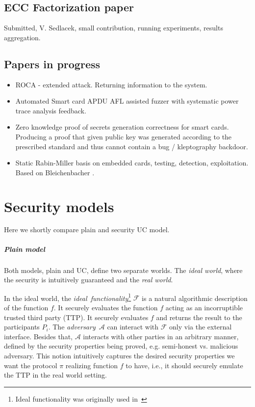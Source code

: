 \documentclass[
  digital, %
  twoside, %
  table,   %
  lof,     %
  lot,     %
]{fithesis3}
\theoremstyle{definition}
\theoremstyle{remark}
\begin{document}
\section{ECC Factorization paper}
Submitted, V. Sedlacek, small contribution, running experiments, results aggregation. 

\section{Papers in progress}
\begin{itemize}
	\item ROCA - extended attack. Returning information to the system.
    
	\item Automated Smart card APDU AFL assisted fuzzer with systematic power trace analysis feedback.
    
    \item Zero knowledge proof of secrets generation correctness for smart cards. Producing a proof that given public key was generated according to the prescribed standard and thus cannot contain a bug / kleptography backdoor. 
    
    \item Static Rabin-Miller basis on embedded cards, testing, detection, exploitation. Based on Bleichenbacher \cite{10.1007/978-3-540-30580-4_2}.
    
\end{itemize}


\chapter{Security models}
\label{apx:uc}
Here we shortly compare plain and security UC model.

\paragraph{Plain model}
Both models, plain and UC, define two separate worlds.
The \emph{ideal world}, where the security is intuitively guaranteed and the \emph{real world}.

In the ideal world, the \emph{ideal~functionality}\footnote{Ideal functionality was originally used in~\cite{GMW87}} $\mathcal{F}$ is a natural algorithmic description of the function $f$. It securely evaluates the function $f$ acting as an incorruptible trusted third party (TTP). It securely evaluates $f$ and returns the result to the participants $P_i$. The \emph{adversary}~$\mathcal{A}$ can interact with $\mathcal{F}$ only via the external interface. Besides that, $\mathcal{A}$ interacts with other parties in an arbitrary manner, defined by the security properties being proved, e.g. semi-honest vs. malicious adversary.
This notion intuitively captures the desired security properties we want the protocol $\pi$ realizing function $f$ to have, i.e., it should securely emulate the TTP in the real world setting.
\end{document}
